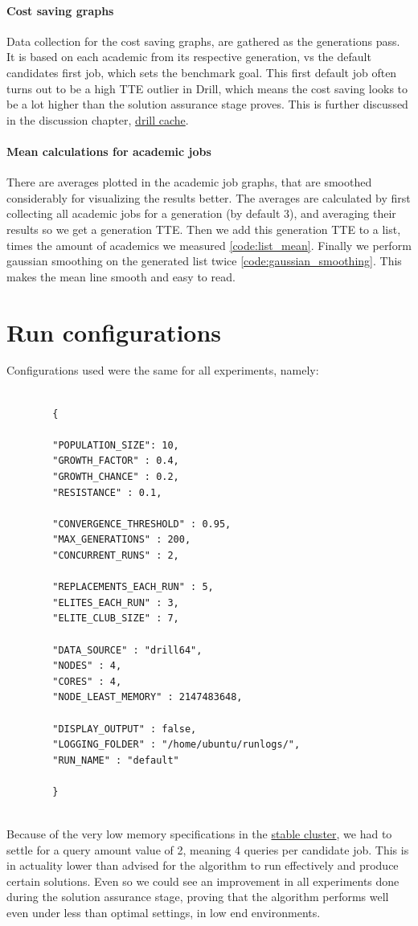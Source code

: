 \documentclass[a4paper,english]{report}
\begin{document}
	\paragraph{Cost saving graphs}
	Data collection for the cost saving graphs, are gathered as the generations pass. It is based on each academic from its respective generation, vs the default candidates first job, which sets the benchmark goal. This first default job often turns out to be a high TTE outlier in Drill, which means the cost saving looks to be a lot higher than the solution assurance stage proves. This is further discussed in the discussion chapter, \hyperref[sec:cache]{drill cache}.
	\paragraph{Mean calculations for academic jobs}
	There are averages plotted in the academic job graphs, that are smoothed considerably for visualizing the results better. The averages are calculated by first collecting all academic jobs for a generation (by default 3), and averaging their results so we get a generation TTE. Then we add this generation TTE to a list, times the amount of academics we measured \ref{code:list_mean}. Finally we perform gaussian smoothing on the generated list twice \ref{code:gaussian_smoothing}. This makes the mean line smooth and easy to read.
	\clearpage
	\section{Run configurations}
	Configurations used were the same for all experiments, namely:
	\begin{verbatim}
	
		{
		
		"POPULATION_SIZE": 10,
		"GROWTH_FACTOR" : 0.4,
		"GROWTH_CHANCE" : 0.2,
		"RESISTANCE" : 0.1,
		
		"CONVERGENCE_THRESHOLD" : 0.95,
		"MAX_GENERATIONS" : 200,
		"CONCURRENT_RUNS" : 2,
		
		"REPLACEMENTS_EACH_RUN" : 5,
		"ELITES_EACH_RUN" : 3,
		"ELITE_CLUB_SIZE" : 7,
		
		"DATA_SOURCE" : "drill64",
		"NODES" : 4,
		"CORES" : 4,
		"NODE_LEAST_MEMORY" : 2147483648,
		
		"DISPLAY_OUTPUT" : false,
		"LOGGING_FOLDER" : "/home/ubuntu/runlogs/",
		"RUN_NAME" : "default"
		
		}
		
	\end{verbatim}
	Because of the very low memory specifications in the \hyperref[table:cluster_stable]{stable cluster}, we had to settle for a query amount value of 2, meaning 4 queries per candidate job. This is in actuality lower than advised for the algorithm to run effectively and produce certain solutions. Even so we could see an improvement in all experiments done during the solution assurance stage, proving that the algorithm performs well even under less than optimal settings, in low end environments.
	\clearpage
\end{document}
